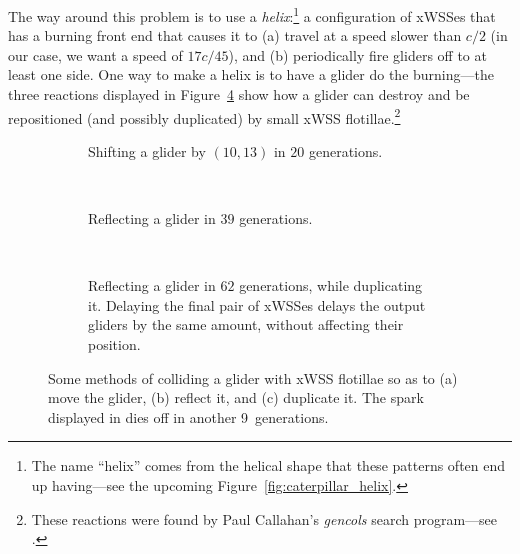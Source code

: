 The way around this problem is to use a \emph{helix}:\footnote{The name ``helix'' comes from the helical shape that these patterns often end up having---see the upcoming Figure~\ref{fig:caterpillar_helix}.} a configuration of xWSSes that has a burning front end that causes it to (a) travel at a speed slower than $c/2$ (in our case, we want a speed of $17c/45$), and (b) periodically fire gliders off to at least one side. One way to make a helix is to have a glider do the burning---the three reactions displayed in Figure~\ref{fig:helix_operations} show how a glider can destroy and be repositioned (and possibly duplicated) by small xWSS flotillae.\footnote{These reactions were found by Paul Callahan's \emph{gencols} search program---see .}

\begin{figure}[!htb]
	\centering
	\begin{subfigure}[b]{0.475\textwidth}
		\centering
		\caption{Shifting a glider by $(10,13)$ in $20$ generations.}\label{fig:helix_shift}
	\end{subfigure} \quad \ \ \ \begin{subfigure}[b]{0.475\textwidth}
		\centering
		\caption{Reflecting a glider in $39$ generations.}\label{fig:helix_reflect}
	\end{subfigure}\\[0.3cm]
	\begin{subfigure}[b]{\textwidth}
		\centering
		\caption{Reflecting a glider in $62$ generations, while duplicating it. Delaying the final pair of xWSSes delays the output gliders by the same amount, without affecting their position.}\label{fig:helix_duplicate}
	\end{subfigure}
	\caption{Some methods of colliding a glider with xWSS flotillae so as to (a) move the glider, (b) reflect it, and (c) duplicate it. The spark displayed in  dies off in another 9~generations.}\label{fig:helix_operations}
\end{figure}

